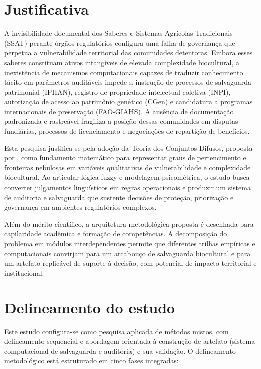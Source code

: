 \section{Justificativa}

A invisibilidade documental dos Saberes e Sistemas Agrícolas Tradicionais (SSAT) perante órgãos regulatórios configura uma falha de governança que perpetua a vulnerabilidade territorial das comunidades detentoras. Embora esses saberes constituam ativos intangíveis de elevada complexidade biocultural, a inexistência de mecanismos computacionais capazes de traduzir conhecimento tácito em parâmetros auditáveis impede a instrução de processos de salvaguarda patrimonial (IPHAN), registro de propriedade intelectual coletiva (INPI), autorização de acesso ao patrimônio genético (CGen) e candidatura a programas internacionais de preservação (FAO-GIAHS). A ausência de documentação padronizada e rastreável fragiliza a posição dessas comunidades em disputas fundiárias, processos de licenciamento e negociações de repartição de benefícios.

Esta pesquisa justifica-se pela adoção da Teoria dos Conjuntos Difusos, proposta por , como fundamento matemático para representar graus de pertencimento e fronteiras nebulosas em variáveis qualitativas de vulnerabilidade e complexidade biocultural. Ao articular lógica fuzzy e modelagem psicométrica, o estudo busca converter julgamentos linguísticos em regras operacionais e produzir um sistema de auditoria e salvaguarda que sustente decisões de proteção, priorização e governança em ambientes regulatórios complexos.

Além do mérito científico, a arquitetura metodológica proposta é desenhada para capilaridade acadêmica e formação de competências. A decomposição do problema em módulos interdependentes permite que diferentes trilhas empíricas e computacionais convirjam para um arcabouço de salvaguarda biocultural e para um artefato replicável de suporte à decisão, com potencial de impacto territorial e institucional.

\section{Delineamento do estudo}

Este estudo configura-se como pesquisa aplicada de métodos mistos, com delineamento sequencial e abordagem orientada à construção de artefato (sistema computacional de salvaguarda e auditoria) e sua validação. O delineamento metodológico está estruturado em cinco fases integradas:

